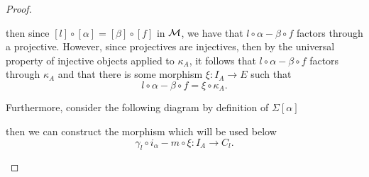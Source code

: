 \begin{proof}
\begin{enumerate}[label={(\bfseries TR\arabic*)}]
{\begin{center}
            \end{center}
            then since \( [l] \circ [\alpha] = [\beta] \circ [f] \) in \( {\mathcal{M}} \), we have that \( l \circ \alpha - \beta \circ f \) factors through a projective. However, since projectives are injectives, then by the universal property of injective objects applied to \( \kappa_A \), it follows that \( l \circ \alpha - \beta \circ f \) factors through \( \kappa_A \) and that there is some morphism \( \xi: I_A \to E \) such that
            \[
                l \circ \alpha - \beta \circ f = \xi \circ \kappa_A.
            \]

            Furthermore, consider the following diagram by definition of \( \Sigma [\alpha] \)
            \begin{center}
            \end{center}
            then we can construct the morphism which will be used below
            \[
                \gamma_{l} \circ i_{\alpha} - m \circ \xi: I_A \to C_{l}.
            \]

}
\end{enumerate}
\end{proof}
